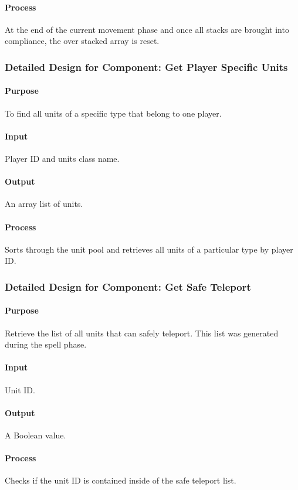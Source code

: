 \documentclass[12pt,a4paper,titlepage]{article}
\begin{document}
\paragraph{Process} At the end of the current movement phase and once all stacks are brought into compliance, the over stacked array is reset.

\subsubsection{Detailed Design for Component: Get Player Specific Units}
\paragraph{Purpose} To find all units of a specific type that belong to one player.
\paragraph{Input} Player ID and units class name.
\paragraph{Output} An array list of units.
\paragraph{Process} Sorts through the unit pool and retrieves all units of a particular type by player ID.

\subsubsection{Detailed Design for Component: Get Safe Teleport}
\paragraph{Purpose} Retrieve the list of all units that can safely teleport. This list was generated during the spell phase.
\paragraph{Input} Unit ID.
\paragraph{Output} A Boolean value.
\paragraph{Process} Checks if the unit ID is contained inside of the safe teleport list.
\end{document}
